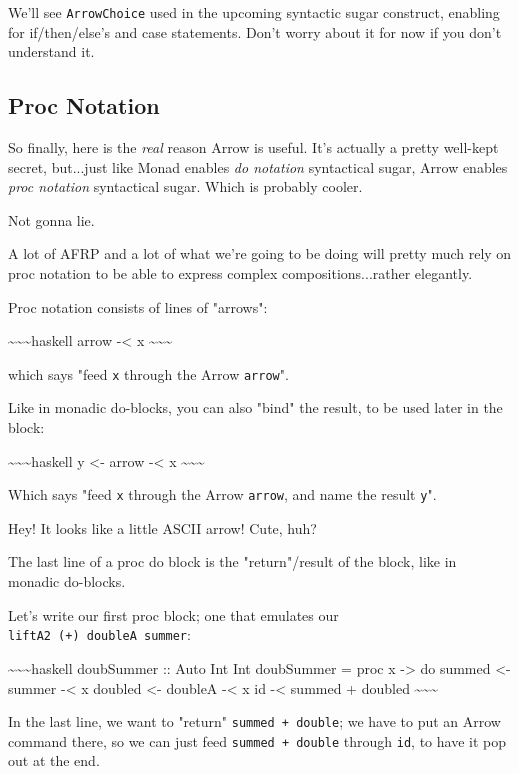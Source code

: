 \documentclass[]{article}
\begin{document}
We'll see \texttt{ArrowChoice} used in the upcoming syntactic sugar construct,
enabling for if/then/else's and case statements. Don't worry about it for now if
you don't understand it.

\subsection{Proc Notation}

So finally, here is the \emph{real} reason Arrow is useful. It's actually a
pretty well-kept secret, but...just like Monad enables \emph{do notation}
syntactical sugar, Arrow enables \emph{proc notation} syntactical sugar. Which
is probably cooler.

Not gonna lie.

A lot of AFRP and a lot of what we're going to be doing will pretty much rely on
proc notation to be able to express complex compositions...rather elegantly.

Proc notation consists of lines of "arrows":

\textasciitilde{}\textasciitilde{}\textasciitilde{}haskell arrow -\textless{} x
\textasciitilde{}\textasciitilde{}\textasciitilde{}

which says "feed \texttt{x} through the Arrow \texttt{arrow}".

Like in monadic do-blocks, you can also "bind" the result, to be used later in
the block:

\textasciitilde{}\textasciitilde{}\textasciitilde{}haskell y \textless{}- arrow
-\textless{} x \textasciitilde{}\textasciitilde{}\textasciitilde{}

Which says "feed \texttt{x} through the Arrow \texttt{arrow}, and name the
result \texttt{y}".

Hey! It looks like a little ASCII arrow! Cute, huh?

The last line of a proc do block is the "return"/result of the block, like in
monadic do-blocks.

Let's write our first proc block; one that emulates our
\texttt{liftA2\ (+)\ doubleA\ summer}:

\textasciitilde{}\textasciitilde{}\textasciitilde{}haskell doubSummer :: Auto
Int Int doubSummer = proc x -\textgreater{} do summed \textless{}- summer
-\textless{} x doubled \textless{}- doubleA -\textless{} x id -\textless{}
summed + doubled \textasciitilde{}\textasciitilde{}\textasciitilde{}

In the last line, we want to "return" \texttt{summed\ +\ double}; we have to put
an Arrow command there, so we can just feed \texttt{summed\ +\ double} through
\texttt{id}, to have it pop out at the end.
\end{document}
